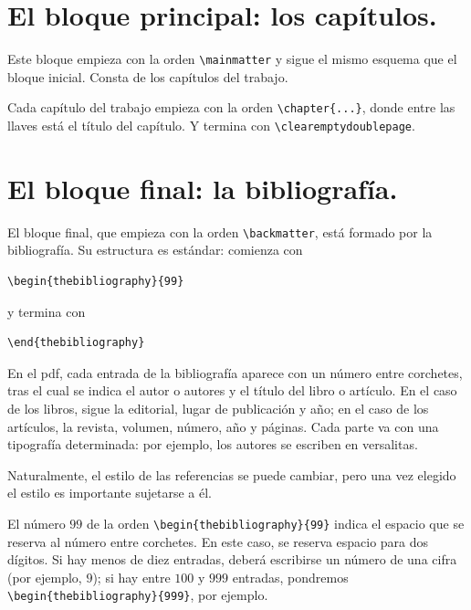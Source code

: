 \documentclass[11pt]{book}
\newcommand{\clearemptydoublepage}{\newpage{\pagestyle{empty}\cleardoublepage}}
\theoremstyle{plain} %
\theoremstyle{definition} %
\begin{document}
\section{El bloque principal: los capítulos.}

Este bloque empieza con la orden \verb"\mainmatter" y sigue el mismo esquema que el bloque inicial. Consta de los capítulos del trabajo.

Cada capítulo del trabajo empieza con la orden \verb"\chapter{...}", donde entre las llaves está el título del capítulo. Y termina con \verb"\clearemptydoublepage".

\section{El bloque final: la bibliografía.}
\label{bibliografia}

El bloque final, que empieza con la orden 
\verb"\backmatter", está formado por la bibliografía.
Su estructura es estándar: comienza con
\begin{verbatim}
\begin{thebibliography}{99}
\end{verbatim}
y termina con
\begin{verbatim}
\end{thebibliography}
\end{verbatim}
En el pdf, cada entrada de la bibliografía aparece 
con un número entre corchetes, tras el cual se indica el autor o autores y el 
título del libro o artículo. En el caso de los libros, sigue la editorial, lugar 
de publicación y año; en el caso de los artículos, la revista, volumen, número, 
año y páginas. Cada parte va con una tipografía determinada: por ejemplo, los 
autores se escriben en versalitas.

Naturalmente, el estilo de las referencias se puede cambiar, pero una vez elegido 
el estilo es importante sujetarse a él.

El número $99$ de la orden \verb"\begin{thebibliography}{99}" indica el espacio 
que se reserva al número entre corchetes. En este caso, se reserva espacio para 
dos dígitos. Si hay menos de diez entradas, deberá escribirse un número de una 
cifra (por ejemplo, $9$); si hay entre $100$ y $999$ entradas, pondremos 
\verb"\begin{thebibliography}{999}", por ejemplo.
\end{document}
